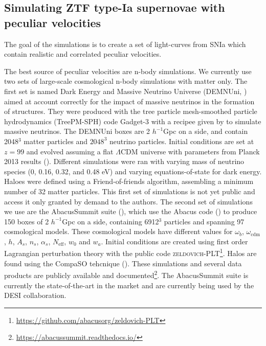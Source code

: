 \subsection{Simulating ZTF type-Ia supernovae with peculiar velocities}
\label{velocities:ztf_fs8:sims}

The goal of the simulations is to create a set of light-curves from SNIa 
which contain realistic and correlated peculiar velocities. 

The best source of peculiar velocities are n-body simulations. 
We currently use two sets of large-scale cosmological n-body simulations 
with matter only. The first set is named Dark Energy and Massive Neutrino Universe 
(DEMNUni, \cite{castorinaDEMNUniClusteringLargescale2015}) aimed at account correctly for 
the impact of massive neutrinos in the formation of structures. 
They were produced with the tree particle mesh-smoothed particle hydrodynamics 
(TreePM-SPH) code Gadget-3 with a recipee given by \cite{vielEffectNeutrinosMatter2010} 
to simulate massive neutrinos. The DEMNUni boxes are 2 $h^{-1}$Gpc on a side, 
and contain 2048$^3$ matter particles and $2048^3$ neutrino particles. Initial conditions 
are set at $z=99$ and evolved assuming a flat $\Lambda$CDM universe with parameters 
from Planck 2013 results (\cite{planckcollaborationPlanck2013Results2014a}). 
Different simulations were ran with varying mass of neutrino species (0, 0.16, 0.32, and 0.48 eV)
and varying equations-of-state for dark energy. 
Haloes were defined using a Friend-of-friends algorithm, assembling a minimum number of 32 
matter particles. This first set of simulations is not yet public and access it only granted 
by demand to the authors. 
The second set of simulations we use are the AbacusSummit suite (\cite{maksimovaABACUSSUMMITMassiveSet2021}), 
which use the Abacus code (\cite{garrisonABACUSCosmologicalNbody2021}) to produce 
150 boxes of 2 $h^{-1}$Gpc on a side, containing 6912$^3$ particles and 
spanning 97 cosmological models. These cosmological models have different 
values for $\omega_b$, $\omega_\text{cdm}$, $h$, $A_s$, $n_s$, $\alpha_s$, 
$N_\text{eff}$, $w_0$ and $w_a$. Initial conditions are created using 
first order Lagrangian perturbation theory with the public code
\textsc{zeldovich-PLT}\footnote{\url{https://github.com/abacusorg/zeldovich-PLT}}.
Halos are found using the CompaSO tehcnique (\cite{hadzhiyskaCOMPASONewHalo2022}).
These simulations and several data products are publicly available and 
documented\footnote{\url{https://abacussummit.readthedocs.io/}}. 
The AbacusSummit suite is currently the state-of-the-art in the market 
and are currently being used by the DESI collaboration. 

